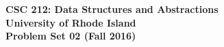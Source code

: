 \documentclass[11pt]{article}
\begin{document}
\begin{center}
{\Large\bf CSC 212: Data Structures and Abstractions}\\
\medskip
{\Large\bf University of Rhode Island}\\
\bigskip
{\Large\bf Problem Set 02 (Fall 2016)}
\end{center}

\bigskip
{}
\bigskip

\end{document}
